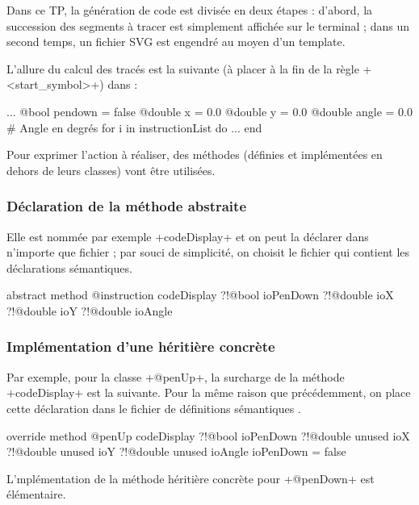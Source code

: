 Dans ce TP, la génération de code est divisée en deux étapes : d'abord, la succession des segments à tracer est simplement affichée sur le terminal ; dans un second temps, un fichier SVG est engendré au moyen d'un template.

L'allure du calcul des tracés est la suivante (à placer à la fin de la règle \ggs+<start_symbol>+) dans  :

\begin{galgas}
  ...
  @bool pendown = false
  @double x = 0.0
  @double y = 0.0
  @double angle = 0.0 # Angle en degrés
  for i in instructionList do
    ...
  end
\end{galgas}

Pour exprimer l'action à réaliser, des méthodes (définies et implémentées en dehors de leurs classes) vont être utilisées.

\subsubsection{Déclaration de la méthode abstraite}
Elle est nommée par exemple \ggs+codeDisplay+ et on peut la déclarer dans n'importe que fichier ; par souci de simplicité, on choisit le fichier  qui contient les déclarations sémantiques.

\begin{galgas}
abstract method @instruction codeDisplay
  ?!@bool ioPenDown
  ?!@double ioX
  ?!@double ioY
  ?!@double ioAngle
\end{galgas}

\subsubsection{Implémentation d'une héritière concrète}

Par exemple, pour la classe \ggs+@penUp+, la surcharge de la méthode \ggs+codeDisplay+ est la suivante. Pour la même raison que précédemment, on place cette déclaration dans le fichier de définitions sémantiques .

\begin{galgas}
override method @penUp codeDisplay
  ?!@bool ioPenDown
  ?!@double unused ioX
  ?!@double unused ioY
  ?!@double unused ioAngle
{
  ioPenDown = false
}
\end{galgas}

L'mplémentation de la méthode héritière concrète pour \ggs+@penDown+ est élémentaire.

